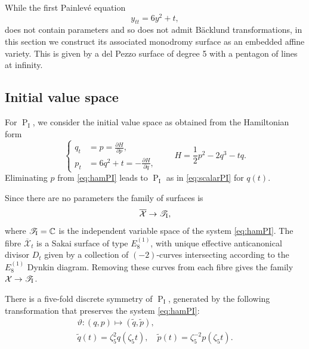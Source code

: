\documentclass[a4paper,reqno]{amsart}
\numberwithin{equation}{section}
\newcommand{\C}{\mathbb{C}}
\newcommand{\pain}[1]{\operatorname{P}_{\mathrm{#1}}}
\numberwithin{equation}{section}
\begin{document}
While the first Painlev\'e equation 
\begin{equation} \label{eq:scalarPI}
    y_{tt} = 6 y^2 + t,
\end{equation}
does not contain parameters and so does not admit B\"acklund transformations, in this section we construct its associated monodromy surface as an embedded affine variety.
This is given by a del Pezzo surface of degree 5 with a pentagon of lines at infinity.

\subsection{Initial value space}


For $\pain{I}$, we consider the initial value space as obtained from the Hamiltonian form 
\begin{equation} \label{eq:hamPI}
    \left\{
    \begin{aligned} 
    q_t &= p = \frac{\partial H}{\partial p}, \\
    p_t &= 6 q^2 + t= - \frac{\partial H}{\partial q},
    \end{aligned}
    \right. \qquad
    H = \frac{1}{2} p^2 - 2 q^3 - t q.
\end{equation}
Eliminating $p$ from \eqref{eq:hamPI} leads to $\pain{I}$ as in \eqref{eq:scalarPI} for $q(t)$.

Since there are no parameters the family of surfaces is 
\begin{equation*}
    \overline{\mathcal{X}}\to \mathscr{T}_{\rm{I}},
\end{equation*}
where $\mathscr{T}_{\rm{I}}=\C$ is the independent variable space of the system \eqref{eq:hamPI}.
The fibre $\overline{\mathcal{X}}_t$ is a Sakai surface of type $E_8^{(1)}$, with unique effective anticanonical divisor $D_t$ given by a collection of $(-2)$-curves intersecting according to the $E_8^{(1)}$ Dynkin diagram.
Removing these curves from each fibre gives the family $\mathcal{X}\to\mathscr{T}_{\rm{I}}$.

There is a five-fold discrete symmetry of $\pain{I}$, generated by the following transformation that preserves the system \eqref{eq:hamPI}: 
\begin{equation} \label{eq:discreteonqpPI}
    \begin{gathered}
        \vartheta : (q,p) \mapsto (\tilde{q},\tilde{p}),\\
        \tilde{q}(t) = \zeta_5^2 q( \zeta_5 t), \quad \tilde{p}(t) = \zeta_5^{-2} p( \zeta_5 t).
    \end{gathered}
\end{equation} 
\end{document}
